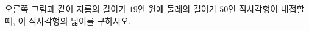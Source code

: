 \noindent\begin{minipage}[t]{0.58\linewidth}\vspace{0pt}\raggedright 오른쪽 그림과 같이 지름의 길이가 $19$인 원에 둘레의 길이가 $50$인 직사각형이 내접할 때, 이 직사각형의 넓이를 구하시오.\end{minipage}\hfill\begin{minipage}[t]{0.4\linewidth}\vspace{0pt}\centering \resizebox{\ifdim\width>\linewidth\linewidth\else\width\fi}{!}{}\end{minipage}\par
